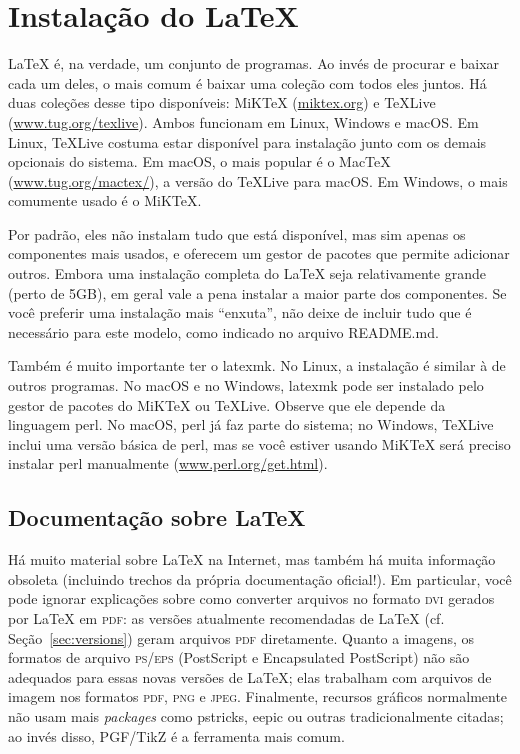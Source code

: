 
\chapter{Instalação do \LaTeX{}}
\label{chap:install}

\LaTeX{} é, na verdade, um conjunto de programas. Ao invés de procurar e
baixar cada um deles, o mais comum é baixar uma coleção com todos eles juntos.
Há duas coleções desse tipo disponíveis: MiK\TeX{} (\url{miktex.org}) e
\TeX{}Live (\url{www.tug.org/texlive}). Ambos funcionam em Linux, Windows e
macOS. Em Linux, \TeX{}Live costuma estar disponível para instalação junto
com os demais opcionais do sistema. Em macOS, o mais popular é o Mac\TeX{}
(\url{www.tug.org/mactex/}), a versão do \TeX{}Live para macOS. Em Windows,
o mais comumente usado é o MiK\TeX{}.

Por padrão, eles não instalam tudo que está disponível, mas sim apenas os
componentes mais usados, e oferecem um gestor de pacotes que permite adicionar
outros. Embora uma instalação completa do \LaTeX{} seja relativamente grande
(perto de 5GB), em geral vale a pena instalar a maior parte dos componentes.
Se você preferir uma instalação mais ``enxuta'', não deixe de incluir tudo
que é necessário para este modelo, como indicado no arquivo README.md.

Também é muito importante ter o \textsf{latexmk}. No Linux, a instalação
é similar à de outros programas. No macOS e no Windows, \textsf{latexmk}
pode ser instalado pelo gestor de pacotes do MiK\TeX{} ou \TeX{}Live.
Observe que ele depende da linguagem \textsf{perl}. No macOS,
\textsf{perl} já faz parte do sistema; no Windows, \TeX{}Live inclui
uma versão básica de perl, mas se você estiver usando MiK\TeX{} será
preciso instalar \textsf{perl} manualmente (\url{www.perl.org/get.html}).

\section{Documentação sobre \LaTeX}
\label{sec:docs}

Há muito material sobre \LaTeX{} na Internet, mas também há muita informação
obsoleta (incluindo trechos da própria documentação oficial!). Em particular,
você pode ignorar explicações sobre como converter arquivos no formato
\textsc{dvi} gerados por \LaTeX{} em \textsc{pdf}: as versões atualmente
recomendadas de \LaTeX{} (cf. Seção~\ref{sec:versions}) geram arquivos
\textsc{pdf} diretamente. Quanto a imagens, os formatos de arquivo
\textsc{ps/eps} (PostScript e Encapsulated PostScript) não são adequados
para essas novas versões de \LaTeX{}; elas trabalham com arquivos de imagem
nos formatos \textsc{pdf}, \textsc{png} e \textsc{jpeg}. Finalmente,
recursos gráficos normalmente não usam mais \textit{packages} como
\textsf{pstricks}, \textsf{eepic} ou outras tradicionalmente citadas;
ao invés disso, \textsf{PGF/TikZ} é a ferramenta mais comum.

